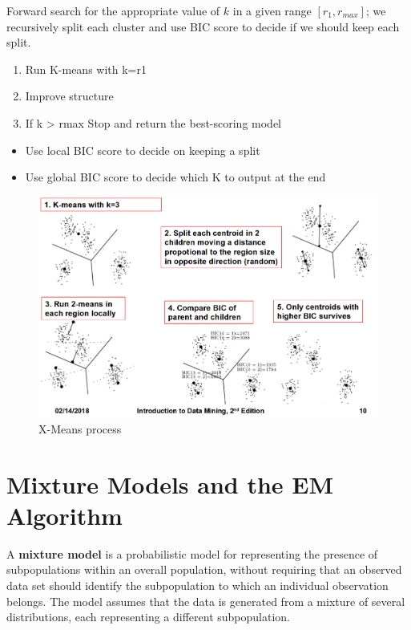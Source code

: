 Forward search for the appropriate value of $k$ in a given
range $[r_1,r_{max}]$; we recursively split each cluster and use BIC score to
decide if we should keep each split.
\begin{enumerate}
	\item Run K-means with k=r1
	\item Improve structure
	\item If k > rmax Stop and return the best-scoring model
\end{enumerate}
\begin{itemize}
	\item Use local BIC score to decide on keeping a split
	\item Use global BIC score to decide which K to output at the end
\end{itemize}

\begin{figure}[htbp]
   \centering
   \includegraphics{images/07/XMeans.png}
   \caption{X-Means process}
   \label{fig:07/xmeans}
\end{figure}

\section{Mixture Models and the EM Algorithm}

A \textbf{mixture model} is a probabilistic model for representing the presence of subpopulations within an overall population, without requiring that an observed data set should identify the subpopulation to which an individual observation belongs. The model assumes that the data is generated from a mixture of several distributions, each representing a different subpopulation.


